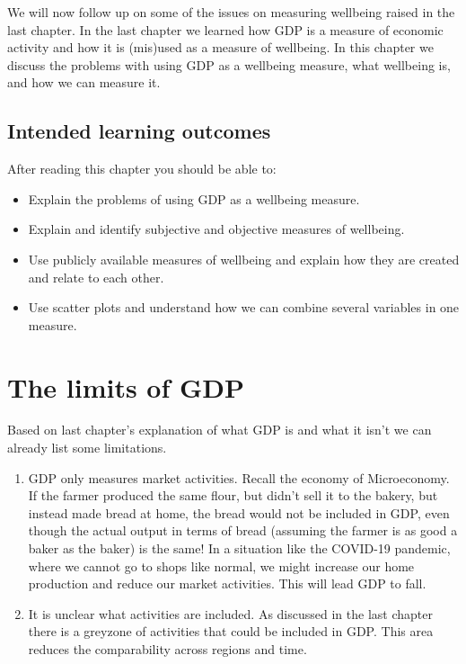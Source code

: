 \documentclass[
]{book}
\providecommand{\tightlist}{%
  \setlength{\itemsep}{0pt}\setlength{\parskip}{0pt}}
\begin{document}
We will now follow up on some of the issues on measuring wellbeing raised in the last chapter. In the last chapter we learned how GDP is a measure of economic activity and how it is (mis)used as a measure of wellbeing. In this chapter we discuss the problems with using GDP as a wellbeing measure, what wellbeing is, and how we can measure it.

\hypertarget{intended-learning-outcomes-1}{%
\subsection{Intended learning outcomes}\label{intended-learning-outcomes-1}}

After reading this chapter you should be able to:

\begin{itemize}
\tightlist
\item
  Explain the problems of using GDP as a wellbeing measure.
\item
  Explain and identify subjective and objective measures of wellbeing.
\item
  Use publicly available measures of wellbeing and explain how they are created and relate to each other.
\item
  Use scatter plots and understand how we can combine several variables in one measure.
\end{itemize}

\hypertarget{the-limits-of-gdp}{%
\section{The limits of GDP}\label{the-limits-of-gdp}}

Based on last chapter's explanation of what GDP is and what it isn't we can already list some limitations.

\begin{enumerate}
\def\labelenumi{\arabic{enumi}.}
\item
  GDP only measures market activities. Recall the economy of Microeconomy. If the farmer produced the same flour, but didn't sell it to the bakery, but instead made bread at home, the bread would not be included in GDP, even though the actual output in terms of bread (assuming the farmer is as good a baker as the baker) is the same! In a situation like the COVID-19 pandemic, where we cannot go to shops like normal, we might increase our home production and reduce our market activities. This will lead GDP to fall.
\item
  It is unclear what activities are included. As discussed in the last chapter there is a greyzone of activities that could be included in GDP. This area reduces the comparability across regions and time.
\end{enumerate}
\end{document}
